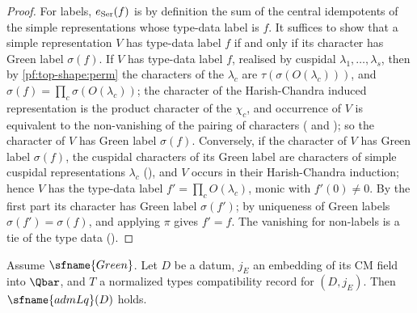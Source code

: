 \begin{proof}
For labels, $e_{\rm Ser}(f)$ is by definition the sum of the central idempotents of the simple representations
whose type-data label is $f$. It suffices to show that a simple representation $V$ has type-data label $f$ if and
only if its character has Green label $\sigma(f)$. If $V$ has type-data label $f$, realised by cuspidal
$\lambda_1,\dots,\lambda_s$, then by \cref{pf:top-shape:perm} the characters of the $\lambda_c$ are
$\tau(\sigma(O(\lambda_c)))$, and $\sigma(f)=\prod_c\sigma(O(\lambda_c))$; the character of the Harish-Chandra induced
representation is the product character of the $\chi_c$, and occurrence of $V$ is equivalent to the non-vanishing of
the pairing of characters ( and );
so the character of $V$ has Green label $\sigma(f)$. Conversely, if the character of $V$ has Green label
$\sigma(f)$, the cuspidal characters of its Green label are characters of simple cuspidal representations
$\lambda_c$ (), and $V$ occurs in their
Harish-Chandra induction; hence $V$ has the type-data label $f'=\prod_cO(\lambda_c)$, monic with $f'(0)\ne0$. By
the first part its character has Green label $\sigma(f')$; by uniqueness of Green labels $\sigma(f')=\sigma(f)$,
and applying $\pi$ gives $f'=f$. The vanishing for non-labels is a tie of the type data
().
\end{proof}

\begin{proposition}\label{pf:top-shape:admLqthm}
Assume $\sfname{Green}$. Let $D$ be a datum, $j_E$ an embedding of its CM field into $\Qbar$, and $T$ a normalized
types compatibility record for $(D,j_E)$. Then $\sfname{admLq}(D)$ holds.
\end{proposition}

